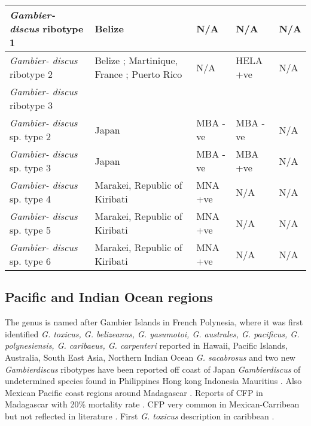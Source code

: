 \documentclass[12pt]{article}
\begin{document}
\begin{longtable}{ | p{2cm} | p{5.5cm} | p{2.3cm} | p{2.3cm} | p{2.3cm} | }
	\hline	
	\emph{Gambier- discus} ribotype 1 & Belize \cite{litaker2010global} & N/A & N/A & N/A \\
	\hline
	\emph{Gambier- discus} ribotype 2 & Belize \cite{litaker2010global}; Martinique, France \cite{litaker2010global}; Puerto Rico \cite{holland2013differences} & N/A & HELA +ve \cite{holland2013differences} & N/A\\
	\hline
	\emph{Gambier- discus} ribotype 3 & & & & \\ %
	\hline
	\emph{Gambier- discus} sp. type 2 & Japan \cite{nishimura2013genetic} & MBA -ve \cite{nishimura2013genetic} & MBA -ve \cite{nishimura2013genetic} & N/A \\
	\hline
	\emph{Gambier- discus} sp. type 3 & Japan \cite{nishimura2013genetic} & MBA -ve \cite{nishimura2013genetic} & MBA +ve \cite{nishimura2013genetic} & N/A \\
	\hline
	\emph{Gambier- discus} sp. type 4 &  Marakei, Republic of Kiribati \cite{xu2014distribution}& MNA +ve \cite{xu2014distribution} & N/A & N/A \\
	\hline
	\emph{Gambier- discus} sp. type 5 & Marakei, Republic of Kiribati \cite{xu2014distribution}& MNA +ve \cite{xu2014distribution} & N/A & N/A \\
	\hline
	\emph{Gambier- discus} sp. type 6 & Marakei, Republic of Kiribati \cite{xu2014distribution}& MNA +ve \cite{xu2014distribution} & N/A & N/A \\
	\hline
	\end{longtable}
	\FloatBarrier
\subsection{Pacific and Indian Ocean regions}
The genus is named after Gambier Islands in French Polynesia, where it was first identified \cite{adachi1979thecal}
\emph{G. toxicus, G. belizeanus, G. yasumotoi, G. australes, G. pacificus, G. polynesiensis, G. caribaeus, G. carpenteri} reported in Hawaii, Pacific Islands, Australia, South East Asia, Northern Indian Ocean %
\emph{G. sacabrosus} and two new \emph{Gambierdiscus} ribotypes have been reported off coast of Japan \cite{nishimura2013genetic,nishimura2014morphology}
\emph{Gambierdiscus} of undetermined species found in Philippines \cite{gillespie1987possible} Hong kong \cite{lu2004harmful} Indonesia \cite{praseno1996hab} Mauritius \cite{hurbungs2002seasonal}. Also Mexican Pacific coast \cite{ceballos2006analisis} regions around Madagascar \cite{grzebyk1994ecology}. 
Reports of CFP in Madagascar with 20\% mortality rate \cite{habermehl1994severe}. CFP very common in Mexican-Carribean but not reflected in literature \cite{hernandez2004species}.
First \emph{G. toxicus} description in caribbean \cite{besada1982observations}.
\end{document}
